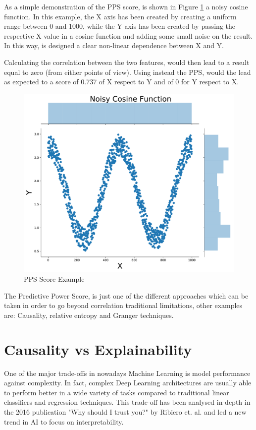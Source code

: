 As a simple demonstration of the PPS score, is shown in Figure \ref{pps_ex} a noisy cosine function. In this example, the X axis has been created by creating a uniform range between 0 and 1000, while the Y axis has been created by passing the respective X value in a cosine function and adding some small noise on the result. In this way, is designed a clear non-linear dependence between X and Y. 

Calculating the correlation between the two features, would then lead to a result equal to zero (from either points of view). Using instead the PPS, would the lead as expected to a score of 0.737 of X respect to Y and of 0 for Y respect to X. 

\begin{figure}[ht!]%
    \centering
    \includegraphics[width=0.45\linewidth]{latex/images/pps_ex.pdf}
    \vspace{-0.2cm}
    \caption{PPS Score Example}
    \label{pps_ex}
\end{figure}

The Predictive Power Score, is just one of the different approaches which can be taken in order to go beyond correlation traditional limitations, other examples are: Causality, relative entropy and Granger techniques.

\section{Causality vs Explainability}
One of the major trade-offs in nowadays Machine Learning is model performance against complexity. In fact, complex Deep Learning architectures are usually able to perform better in a wide variety of tasks compared to traditional linear classifiers and regression techniques. This trade-off has been analysed in-depth in the 2016 publication "Why should I trust you?" by Ribiero et. al. \cite{otto} and led a new trend in AI to focus on interpretability.

